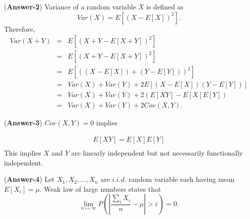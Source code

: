\documentclass[11pt,twoside,reqno]{article}
\begin{document}
({\bf Answer-2}) Variance of a random variable $X$ is defined as 
\[
Var(X) = E[(X-E[X])^2].
\]
Therefore,
\begin{eqnarray*}
Var(X + Y) &=&  E[(X + Y -E[X + Y])^2] \\
&=&  E[(X + Y -E[X + Y])^2] \\
&=& E[ ((X -E[X]) + (Y - E[Y]))^2] \\
&=& Var(X) + Var(Y) + 2 E[(X -E[X])(Y - E[Y])]\\
&=& Var(X) + Var(Y) + 2(E[XY] - E[X]E[Y]) \\
&=& Var(X) + Var(Y) + 2Cov(X,Y).
\end{eqnarray*}


({\bf Answer-3}) $Cov(X,Y) = 0$ implies 

\begin{eqnarray*}
E[XY] = E[X]E[Y] \\
\end{eqnarray*}
This implies $X$ and $Y$ are linearly independent but not necessarily functionally independent.  

({\bf Answer-4}) Let $X_1, X_2, ..., X_n$ are $i.i.d.$ random variable each having mean $E[X_i] = \mu$. Weak law of large numbers states that
\[
\lim\limits_{n\mapsto \infty} P\left(\left|\frac{\sum_{i}X_i}{n} -\mu\right| > \varepsilon \right) = 0.
\]
\end{document}
